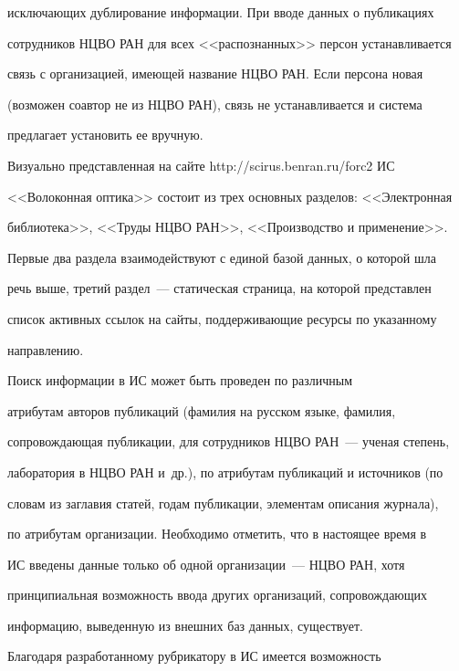 исключающих дублирование информации. При вводе данных о публикациях 


сотрудников НЦВО РАН для всех <<распознанных>> персон устанавливается 


связь с организацией, имеющей название НЦВО РАН. Если персона новая 


(возможен соавтор не из НЦВО РАН), связь не устанавливается и система 


предлагает установить ее вручную. 


     


     Визуально представленная на сайте {\sf http://scirus.benran.ru/forc2} ИС 


<<Волоконная оптика>> состоит из трех основных разделов: <<Электронная 


библиотека>>, <<Труды НЦВО РАН>>, <<Производство и применение>>. 


Первые два раздела взаимодействуют с единой базой данных, о которой шла 


речь выше, третий раздел~--- статическая страница, на которой представлен 


список активных ссылок на сайты, поддерживающие ресурсы по указанному 


направлению.


     


     Поиск информации в ИС может быть проведен по различным 


атрибутам авторов публикаций (фамилия на русском языке, фамилия, 


сопровождающая публикации, для сотрудников НЦВО РАН~--- ученая степень, 


лаборатория в НЦВО РАН и~др.), по атрибутам публикаций и источников (по 


словам из заглавия статей, годам публикации, элементам описания журнала), 


по атрибутам организации. Необходимо отметить, что в настоящее время в 


ИС введены данные только об одной организации~--- НЦВО РАН, хотя 


принципиальная возможность ввода других организаций, сопровождающих 


информацию, выведенную из внешних баз данных, существует. 


     


     Благодаря разработанному рубрикатору в ИС имеется возможность 


